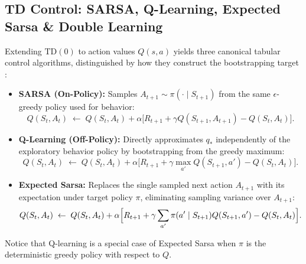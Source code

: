 \documentclass[../../../../master.tex]{subfiles}
\begin{document}
\subsection{TD Control: SARSA, Q-Learning, Expected Sarsa \& Double Learning}

Extending $\mathrm{TD}(0)$ to action values $Q(s, a)$ yields three canonical tabular control algorithms, distinguished by how they construct the bootstrapping target :
\begin{itemize}
  \item \textbf{SARSA (On-Policy):} Samples $A_{t+1} \sim \pi(\cdot \mid S_{t+1})$ from the same $\epsilon$-greedy policy used for behavior:
  \begin{equation}
    Q(S_t, A_t) \;\leftarrow\; Q(S_t, A_t) + \alpha \bigl[ R_{t+1} + \gamma Q(S_{t+1}, A_{t+1}) - Q(S_t, A_t) \bigr].
    \label{eq:td:sarsa}
  \end{equation}
  \item \textbf{Q-Learning (Off-Policy):} Directly approximates $q_*$ independently of the exploratory behavior policy by bootstrapping from the greedy maximum:
  \begin{equation}
    Q(S_t, A_t) \;\leftarrow\; Q(S_t, A_t) + \alpha \bigl[ R_{t+1} + \gamma \max_{a'} Q(S_{t+1}, a') - Q(S_t, A_t) \bigr].
    \label{eq:td:qlearning}
  \end{equation}
  \item \textbf{Expected Sarsa:} Replaces the single sampled next action $A_{t+1}$ with its expectation under target policy $\pi$, eliminating sampling variance over $A_{t+1}$:
  \begin{equation}
    Q(S_t, A_t) \;\leftarrow\; Q(S_t, A_t) + \alpha \Bigl[ R_{t+1} + \gamma \sum_{a'} \pi(a' \mid S_{t+1}) Q(S_{t+1}, a') - Q(S_t, A_t) \Bigr].
    \label{eq:td:expected_sarsa}
  \end{equation}
\end{itemize}
Notice that Q-learning is a special case of Expected Sarsa when $\pi$ is the deterministic greedy policy with respect to $Q$.
\end{document}
